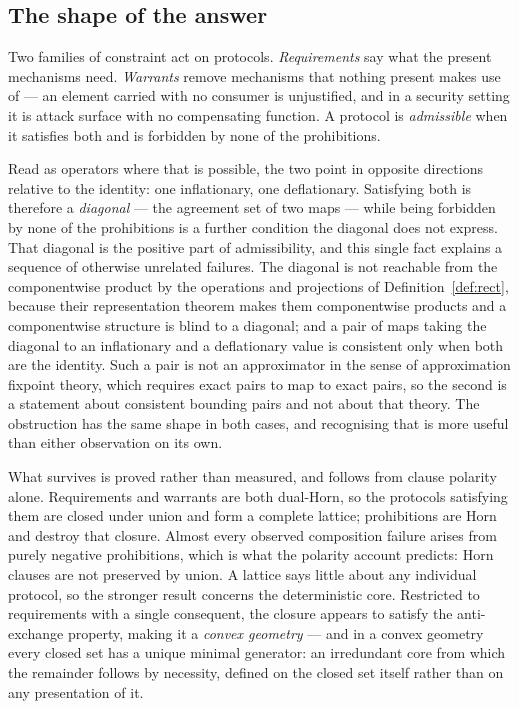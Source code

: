 \documentclass[11pt,reqno]{amsart}
\theoremstyle{plain}
\theoremstyle{definition}
\theoremstyle{remark}
\begin{document}
\subsection{The shape of the answer}

Two families of constraint act on protocols. \emph{Requirements} say what the
present mechanisms need. \emph{Warrants} remove mechanisms that
nothing present makes use of --- an element carried with no consumer is
unjustified, and in a security setting it is attack surface with no compensating
function. A protocol is \emph{admissible} when it satisfies both and is forbidden
by none of the prohibitions.

Read as operators where that is possible, the two point in opposite directions
relative to the identity: one inflationary, one deflationary. Satisfying both is therefore a
\emph{diagonal} --- the agreement set of two maps --- while being forbidden by
none of the prohibitions is a further condition the diagonal does not express.
That diagonal is the positive part of admissibility, and this single fact
explains a sequence of otherwise unrelated failures. The diagonal is not
reachable from the componentwise product by the operations and projections of
Definition~\ref{def:rect}, because their representation theorem makes them
componentwise products and a
componentwise structure is blind to a diagonal; and a pair of maps taking the
diagonal to an inflationary and a deflationary value is consistent only when both
are the identity. Such a pair is not an approximator in the sense of
approximation fixpoint theory, which requires exact pairs to map to exact pairs,
so the second is a statement about consistent bounding pairs and not about that
theory. The obstruction has the same shape in both cases, and recognising that is
more useful than either observation on its own.

What survives is proved rather than measured, and follows from clause polarity
alone. Requirements and warrants are both dual-Horn, so the protocols satisfying
them are closed under union and form a complete lattice; prohibitions are Horn and destroy that closure. Almost every observed composition failure arises from purely negative
prohibitions, which is what the polarity account predicts: Horn clauses are not
preserved by union. A lattice says little about any individual protocol, so the stronger result
concerns the deterministic core. Restricted to requirements with a single consequent, the
closure appears to satisfy the anti-exchange property, making it a \emph{convex
geometry} --- and in a convex geometry every closed set has a unique minimal
generator: an irredundant core from which the remainder follows by necessity,
defined on the closed set itself rather than on any presentation of it.
\end{document}
